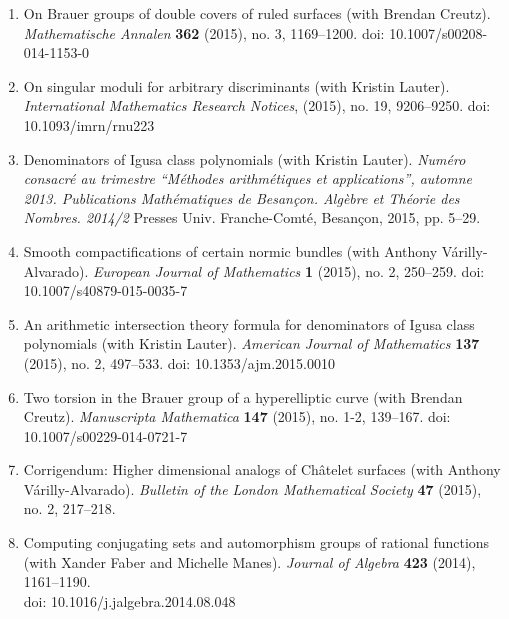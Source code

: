 \documentclass[12pt]{article}
\begin{document}
\begin{enumerate}[itemsep=-1mm, leftmargin=24mm]
			\item
			{On Brauer groups of double covers of ruled surfaces}
			(with Brendan Creutz).\\ \textit{Mathematische Annalen} \textbf{362} (2015), no. 3, 1169--1200. doi: 10.1007/s00208-014-1153-0
            
			\item
			{On singular moduli for arbitrary discriminants}
			(with Kristin Lauter). \textit{International Mathematics Research Notices}, (2015), no. 19, 9206--9250.
             doi: 10.1093/imrn/rnu223

			\item
			{Denominators of Igusa class polynomials}
			(with Kristin Lauter). \textit{Num\'ero consacr\'e au trimestre ``M\'ethodes arithm\'etiques
	     et applications'', automne 2013.  Publications Math\'ematiques de Besan\c{c}on. Alg\`ebre et Th\'eorie des Nombres. 2014/2} Presses Univ. Franche-Comt\'e, Besan\c{c}on, 2015, pp. 5--29.

			\item
			{Smooth compactifications of certain normic bundles}
			(with Anthony V\'arilly-Alvarado). 
			\textit{European Journal of Mathematics} \textbf{1} (2015), no. 2, 
			250--259. doi: 10.1007/s40879-015-0035-7
            
			\item
			{An arithmetic intersection theory formula for denominators of Igusa
			class polynomials}
			(with Kristin Lauter). \textit{American Journal of Mathematics}
             \textbf{137} (2015), no. 2, 497--533.  doi: 10.1353/ajm.2015.0010
            
			\item
			{Two torsion in the Brauer group of a hyperelliptic curve}
			(with Brendan Creutz).
            \textit{Manuscripta Mathematica} \textbf{147} (2015), no. 1-2, 
            139--167. doi: 10.1007/s00229-014-0721-7
			
			\item
			{Corrigendum: Higher dimensional analogs of Ch\^atelet surfaces}
			(with Anthony V\'arilly-Alvarado). \textit{Bulletin of the London Mathematical Society} \textbf{47} (2015), no. 2, 217--218.

			\item
			{Computing conjugating sets and automorphism groups of rational functions}
			(with Xander Faber and Michelle Manes).  
			\textit{Journal of Algebra} \textbf{423} (2014), 1161--1190.\\
            doi: 10.1016/j.jalgebra.2014.08.048


\end{enumerate}
\end{document}
